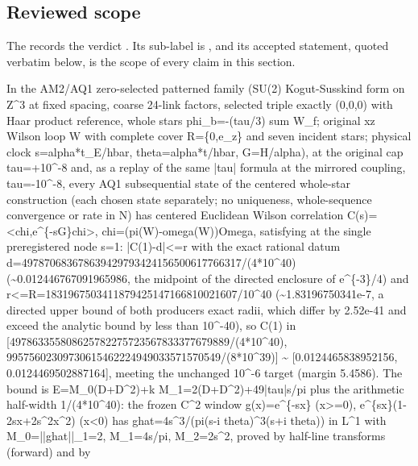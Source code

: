 \subsection{Reviewed scope}
The  records the
verdict . Its sub-label is
, and its accepted statement, quoted verbatim
below, is the scope of every claim in this section.
\begin{gatequote}
In the AM2/AQ1 zero-selected patterned family (SU(2) Kogut-Susskind form on
Z\textasciicircum{}3 at fixed spacing, coarse 24-link factors, selected triple
exactly (0,0,0) with Haar product reference, whole stars phi\_b=-(tau/3) sum
W\_f; original xz Wilson loop W with complete cover R=\{0,e\_z\} and seven
incident stars; physical clock s=alpha*t\_E/hbar, theta=alpha*t/hbar,
G=H/alpha), at the original cap tau=+10\textasciicircum{}-8 and, as a replay
of the same |tau| formula at the mirrored coupling,
tau=-10\textasciicircum{}-8, every AQ1 subsequential state of the centered
whole-star construction (each chosen state separately; no uniqueness,
whole-sequence convergence or rate in N) has centered Euclidean Wilson
correlation C(s)=<chi,e\textasciicircum{}\{-sG\}chi>,
chi=(pi(W)-omega(W))Omega, satisfying at the single preregistered node s=1:
|C(1)-d|<=r with the exact rational datum
d=497870683678639429793424156500617766317/(4*10\textasciicircum{}40)
(\textasciitilde{}0.012446767091965986, the midpoint of the directed enclosure
of e\textasciicircum{}\{-3\}/4) and
r<=R=1831967503411879425147166810021607/10\textasciicircum{}40
(\textasciitilde{}1.83196750341e-7, a directed upper bound of both producers\textquotesingle{}
exact radii, which differ by 2.52e-41 and exceed the analytic bound by less
than 10\textasciicircum{}-40), so C(1) in
[497863355808625782275723567833377679889/(4*10\textasciicircum{}40),
99575602309730615462224949033571570549/(8*10\textasciicircum{}39)]
\textasciitilde{} [0.0124465838952156, 0.0124469502887164], meeting the
unchanged 10\textasciicircum{}-6 target (margin 5.4586). The bound is
E=M\_0(D+D\textasciicircum{}2)+k M\_1=2(D+D\textasciicircum{}2)+49|tau|s/pi
plus the arithmetic half-width 1/(4*10\textasciicircum{}40): the frozen
C\textasciicircum{}2 window g(x)=e\textasciicircum{}\{-sx\} (x>=0),
e\textasciicircum{}\{sx\}(1-2sx+2s\textasciicircum{}2x\textasciicircum{}2)
(x<0) has ghat=4s\textasciicircum{}3/(pi(s-i theta)\textasciicircum{}3(s+i
theta)) in L\textasciicircum{}1 with M\_0=||ghat||\_1=2, M\_1=4s/pi,
M\_2=2s\textasciicircum{}2, proved by half-line transforms (forward) and by

\end{gatequote}
